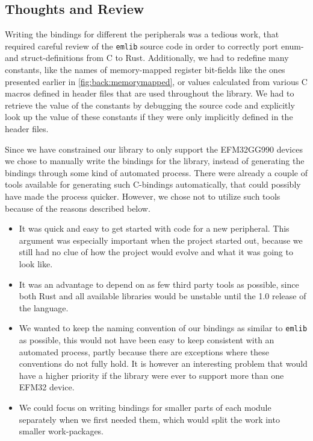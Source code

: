 \subsection{Thoughts and Review}


Writing the bindings for different the peripherals was a tedious work, that required careful review of the \texttt{emlib} source code in order to correctly port enum- and struct-definitions from C to Rust.
Additionally, we had to redefine many constants, like the names of memory-mapped register bit-fields like the ones presented earlier in \autoref{fig:back:memorymapped}, or values calculated from various C macros defined in header files that are used throughout the library.
We had to retrieve the value of the constants by debugging the source code and explicitly look up the value of these constants if they were only implicitly defined in the header files.

Since we have constrained our library to only support the EFM32GG990 devices we chose to manually write the bindings for the library, instead of generating the bindings through some kind of automated process.
There were already a couple of tools available for generating such C-bindings automatically, that could possibly have made the process quicker.
However, we chose not to utilize such tools because of the reasons described below.

\begin{itemize}
    \item It was quick and easy to get started with code for a new peripheral.
    This argument was especially important when the project started out, because we still had no clue of how the project would evolve and what it was going to look like.

    \item It was an advantage to depend on as few third party tools as possible, since both Rust and all available libraries would be unstable until the 1.0 release of the language.

    \item We wanted to keep the naming convention of our bindings as similar to \texttt{emlib} as possible, this would not have been easy to keep consistent with an automated process, partly because there are exceptions where these conventions do not fully hold.
    It is however an interesting problem that would have a higher priority if the library were ever to support more than one EFM32 device.

    \item We could focus on writing bindings for smaller parts of each module separately when we first needed them, which would split the work into smaller work-packages.
\end{itemize}
